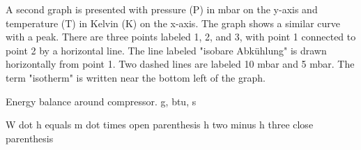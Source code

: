 A second graph is presented with pressure (P) in mbar on the y-axis and temperature (T) in Kelvin (K) on the x-axis. The graph shows a similar curve with a peak. There are three points labeled 1, 2, and 3, with point 1 connected to point 2 by a horizontal line. The line labeled "isobare Abkühlung" is drawn horizontally from point 1. Two dashed lines are labeled 10 mbar and 5 mbar. The term "isotherm" is written near the bottom left of the graph.

Energy balance around compressor. g, btu, s

W dot h equals m dot times open parenthesis h two minus h three close parenthesis